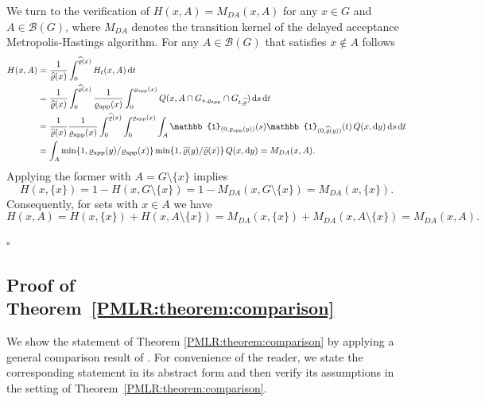 \documentclass[sn-mathphys-num]{sn-jnl}%
\theoremstyle{thmstyleone}%
\theoremstyle{thmstyletwo}%
\theoremstyle{thmstylethree}%
\newcommand{\rhoapp}{\varrho_{{\rm app}}}
\begin{document}
\begin{appendices}
We turn to the verification of $H(x,A)=M_{DA}(x,A)$ for any $x\in G$ and $A\in\mathcal{B}(G)$, where $M_{DA}$ denotes the transition kernel of the delayed acceptance Metropolis-Hastings algorithm. For any $A\in\mathcal{B}(G)$ that satisfies $x\not\in A$ follows
\begin{align*}
	H(x,A)&= \frac{1}{\widehat{\varrho}(x)} \int_{0}^{\widehat{\varrho}(x)} H_t(x,A)  \, \mathrm{d}t \\
	&= \frac{1}{\widehat{\varrho}(x)} \int_{0}^{\widehat{\varrho}(x)} \frac{1}{\rhoapp(x)} \int_0^{\rhoapp(x)} Q(x,A \cap G_{s,\rhoapp} \cap  G_{t,\widehat{\varrho}})  \, \mathrm{d}s  \, \mathrm{d}t\\
	&= \frac{1}{\widehat{\varrho}(x)} \frac{1}{\rhoapp(x)} \int_{0}^{\widehat{\varrho}(x)} \int_0^{\rhoapp(x)} \int_A \mathbb{1}_{(0,\varrho_{\textmd{app}}(y))}(s) \mathbb{1}_{(0,\widehat{\varrho}(y))}(t)  \, Q(x, \mathrm{d}y)  \, \mathrm{d}s  \, \mathrm{d}t \\  
	&= \int_A \min\{1,\rhoapp(y)/\rhoapp(x) \} \min\{1,\widehat{\varrho}(y)/ \widehat{\varrho}(x) \}  \, Q(x, \mathrm{d}y) = M_{DA}(x,A).
\end{align*}
Applying the former with $A=G\setminus\{x\}$ implies 
\[H(x,\{x\})=1-H(x,G\setminus\{x\}) = 1-M_{DA}(x,G\setminus\{x\})=M_{DA}(x,\{x\}).\]
Consequently, for sets with $x\in A$ we have 
\[
H(x,A) = H(x,\{x\}) + H(x,A\setminus\{x\}) = M_{DA}(x,\{x\}) + M_{DA}(x,A\setminus\{x\}) = M_{DA}(x,A).
\]
\begin{flushright}    
$\square$
\end{flushright}

\subsection{Proof of Theorem~\ref{PMLR:theorem:comparison}}\label{Apendix:Comparison}
We show the statement of Theorem \ref{PMLR:theorem:comparison} by applying a general comparison result of \citet[Lemma~1]{RudolfUllrich2018}. For convenience of the reader, we state the corresponding statement in its abstract form and then verify its assumptions in the setting of Theorem~\ref{PMLR:theorem:comparison}.


\end{appendices}
\end{document}
